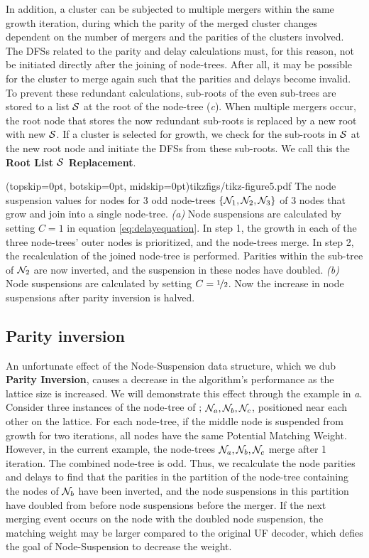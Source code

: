 In addition, a cluster can be subjected to multiple mergers within the same growth iteration, during which the parity of the merged cluster changes dependent on the number of mergers and the parities of the clusters involved. The DFSs related to the parity and delay calculations must, for this reason, not be initiated directly after the joining of node-trees. After all, it may be possible for the cluster to merge again such that the parities and delays become invalid. To prevent these redundant calculations, sub-roots of the even sub-trees are stored to a list $\mathcal{S}$ at the root of the node-tree (\emph{c}). When multiple mergers occur, the root node that stores the now redundant sub-roots is replaced by a new root with new $\mathcal{S}$. If a cluster is selected for growth, we check for the sub-roots in $\mathcal{S}$ at the new root node and initiate the DFSs from these sub-roots. We call this the \textbf{Root List $\mathcal{S}$ Replacement}. 

\Figure[htb](topskip=0pt, botskip=0pt, midskip=0pt){tikzfigs/tikz-figure5.pdf}{
    The node suspension values for nodes for 3 odd node-trees $\{\mathcal{N}_1, \mathcal{N}_2, \mathcal{N}_3\}$ of 3 nodes that grow and join into a single node-tree. \emph{(a)} Node suspensions are calculated by setting $C=1$ in equation \eqref{eq:delayequation}. In step 1, the growth in each of the three node-trees' outer nodes is prioritized, and the node-trees merge. In step 2, the recalculation of the joined node-tree is performed. Parities within the sub-tree of $\mathcal{N}_2$ are now inverted, and the suspension in these nodes have doubled. \emph{(b)} Node suspensions are calculated by setting $C=\nicefrac{1}{2}$. Now the increase in node suspensions after parity inversion is halved.\label{fig5}}

\subsection{Parity inversion}\label{sec:inversion}
An unfortunate effect of the Node-Suspension data structure, which we dub \textbf{Parity Inversion}, causes a decrease in the algorithm's performance as the lattice size is increased. We will demonstrate this effect through the example in \emph{a}. Consider three instances of the node-tree of ; $\mathcal{N}_a, \mathcal{N}_b, \mathcal{N}_c$, positioned near each other on the lattice. For each node-tree, if the middle node is suspended from growth for two iterations, all nodes have the same Potential Matching Weight. However, in the current example, the node-trees $\mathcal{N}_a, \mathcal{N}_b, \mathcal{N}_c$ merge after 1 iteration. The combined node-tree is odd. Thus, we recalculate the node parities and delays to find that the parities in the partition of the node-tree containing the nodes of $\mathcal{N}_b$ have been inverted, and the node suspensions in this partition have doubled from before node suspensions before the merger. If the next merging event occurs on the node with the doubled node suspension, the matching weight may be larger compared to the original UF decoder, which defies the goal of Node-Suspension to decrease the weight.

